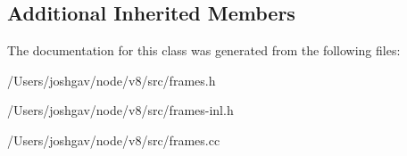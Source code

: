 \subsection*{Additional Inherited Members}


The documentation for this class was generated from the following files\+:\begin{DoxyCompactItemize}
\item 
/\+Users/joshgav/node/v8/src/frames.\+h\item 
/\+Users/joshgav/node/v8/src/frames-\/inl.\+h\item 
/\+Users/joshgav/node/v8/src/frames.\+cc\end{DoxyCompactItemize}

